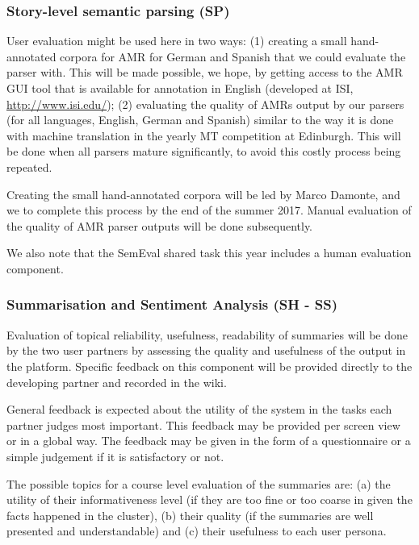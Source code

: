 \subsubsection{Story-level semantic parsing (SP)}\label{sec:validation-semantic-parsing}

User evaluation might be used here in two ways: (1) creating a small hand-annotated corpora for AMR for German and Spanish that we could evaluate the parser with. This will be made possible, we hope, by getting access to the AMR GUI tool that is available for annotation in English (developed at ISI, \url{http://www.isi.edu/}); (2) evaluating the quality of AMRs output by our parsers (for all languages, English, German and Spanish) similar to the way it is done with machine translation in the yearly MT competition at Edinburgh. This will be done when all parsers mature significantly, to avoid this costly process being repeated.

Creating the small hand-annotated corpora will be led by Marco Damonte\cut{)}, and we  to complete this process by the end of the summer 2017. Manual evaluation of the quality of AMR parser outputs will be done subsequently.

We also note that the SemEval shared task this year includes a human evaluation component.


\subsubsection{Summarisation and Sentiment Analysis (SH - SS)}\label{sec:validation-summarisation}

Evaluation of topical reliability, usefulness, readability of summaries will be done by the two user partners by assessing the quality and usefulness of the output in the \SUMMA platform. Specific feedback on this component will be provided directly to the developing partner and recorded in the \SUMMA wiki. 

General feedback is expected about the utility of the system in the tasks each partner judges most important. This feedback may be provided per screen view or in a global way. The feedback may be given in the form of a questionnaire or a simple judgement if it is satisfactory or not.

The possible topics for a course level evaluation of the summaries are:  (a) the utility of their informativeness level (if they are too fine or too coarse in given the facts happened in the cluster), (b) their quality (if the summaries are well presented and understandable) and (c) their usefulness to each user persona.

